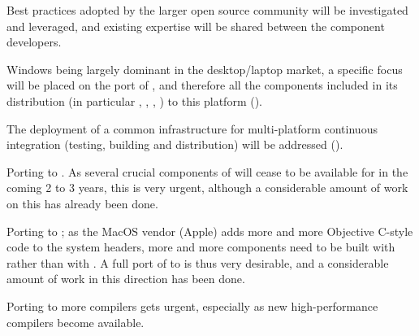 \begin{workpackage}[id=component-architecture,wphases=0-48!.5,
  title=Component Architecture,lead=UV,
  PSRM=46,UVRM=8,SARM=16, USORM=6, UORM=19, LLRM=14, UJFRM=6, UGRM=14]
\begin{tasklist}
\begin{task}[id=portability,title=Portability,lead=UV,PM=35,partners={PS,UG,UO},wphases=0-48,issue=50]
    \begin{compactitem}
    \item Best practices adopted by the larger open source community
      will be investigated and leveraged, and existing expertise will
      be shared between the component developers.
    \item Windows being largely dominant in the desktop/laptop market,
      a specific focus will be placed on the port of \Sage, and
      therefore all the components included in its distribution (in
      particular \PariGP, \GAP, \Singular, \Linbox) to this platform
      ().
    \item The deployment of a common infrastructure for multi-platform
      continuous integration (testing, building and distribution) will
      be addressed
      ().
    \item Porting \Sage to .  As
    several crucial components of \Sage will cease to be available for  in the coming
    2 to 3 years, this is very urgent, although a considerable amount of work on this has already
    been done.
    \item Porting \Sage to \clang; as the MacOS vendor (Apple) adds more and more
    Objective C-style code to the system headers, more and more \Sage components need to be
    built with \clang rather than with \gcc. A full port of \Sage to \clang is thus very
    desirable, and a considerable amount of work in this direction has been done.
    \item Porting \Sage to more \Fortran compilers gets urgent, especially as new
    high-performance \Fortran compilers become available.
    \end{compactitem}


\end{task}
\end{tasklist}
\end{workpackage}
